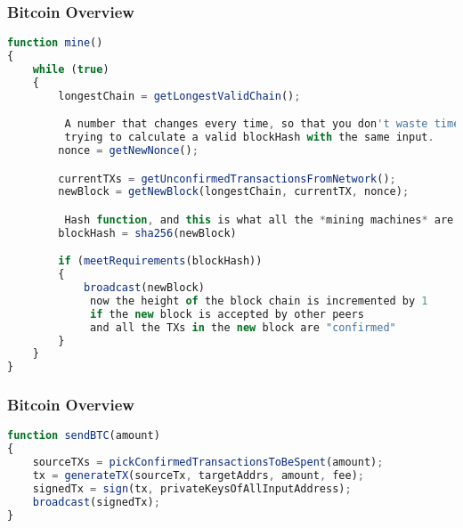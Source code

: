 \begin{frame}[fragile]
    \frametitle{Bitcoin Overview}
    \begin{lstlisting}[language=JavaScript]
function mine()
{
    while (true)
    {
        longestChain = getLongestValidChain();

         A number that changes every time, so that you don't waste time
         trying to calculate a valid blockHash with the same input.
        nonce = getNewNonce();

        currentTXs = getUnconfirmedTransactionsFromNetwork();
        newBlock = getNewBlock(longestChain, currentTX, nonce);

         Hash function, and this is what all the *mining machines* are doing
        blockHash = sha256(newBlock)

        if (meetRequirements(blockHash))
        {
            broadcast(newBlock)
             now the height of the block chain is incremented by 1
             if the new block is accepted by other peers
             and all the TXs in the new block are "confirmed"
        }
    }
}
    \end{lstlisting}
\end{frame}

\begin{frame}[fragile]
    \frametitle{Bitcoin Overview}
    \begin{lstlisting}[language=JavaScript]
function sendBTC(amount)
{
    sourceTXs = pickConfirmedTransactionsToBeSpent(amount);
    tx = generateTX(sourceTx, targetAddrs, amount, fee);
    signedTx = sign(tx, privateKeysOfAllInputAddress);
    broadcast(signedTx);
}
    \end{lstlisting}
\end{frame}

